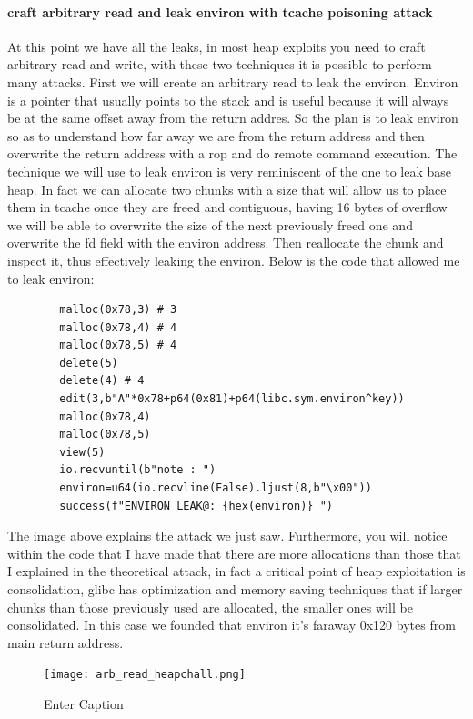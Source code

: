 \documentclass{report}
\begin{document}
    \paragraph{craft arbitrary read and leak environ with tcache poisoning attack}
    At this point we have all the leaks, in most heap exploits you need to craft arbitrary read and write, with these two techniques it is possible to perform many attacks.\newline
    First we will create an arbitrary read to leak the environ.\newline
    Environ is a pointer that usually points to the stack and is useful because it will always be at the same offset away from the return addres.\newline
    So the plan is to leak environ so as to understand how far away we are from the return address and then overwrite the return address with a rop and do remote command execution.\newline
    The technique we will use to leak environ is very reminiscent of the one to leak base heap.\newline
    In fact we can allocate two chunks with a size that will allow us to place them in tcache once they are freed and contiguous,  having 16 bytes of overflow we will be able to overwrite the size of the next previously freed one and overwrite the fd field with the environ address.\newline
    Then reallocate the chunk and inspect it, thus effectively leaking the environ.\newline
    Below is the code that allowed me to leak environ:\newline
    \begin{verbatim}
        malloc(0x78,3) # 3
        malloc(0x78,4) # 4 
        malloc(0x78,5) # 4 
        delete(5)
        delete(4) # 4
        edit(3,b"A"*0x78+p64(0x81)+p64(libc.sym.environ^key))
        malloc(0x78,4)  
        malloc(0x78,5) 
        view(5)
        io.recvuntil(b"note : ")
        environ=u64(io.recvline(False).ljust(8,b"\x00"))
        success(f"ENVIRON LEAK@: {hex(environ)} ")
    \end{verbatim}
    The image above explains the attack we just saw.\newline
    Furthermore, you will notice within the code that I have made that there are more allocations than those that I explained in the theoretical attack, in fact a critical point of heap exploitation is consolidation, glibc has optimization and memory saving techniques that if larger chunks than those previously used are allocated, the smaller ones will be consolidated.
    In this case we founded that environ it's faraway 0x120 bytes from main return address.\newline
    \begin{figure}
        \centering
        \texttt{[image: arb\_read\_heapchall.png]}
        \caption{Enter Caption}
        \label{fig:enter-label}
    \end{figure}
    
\end{document}
